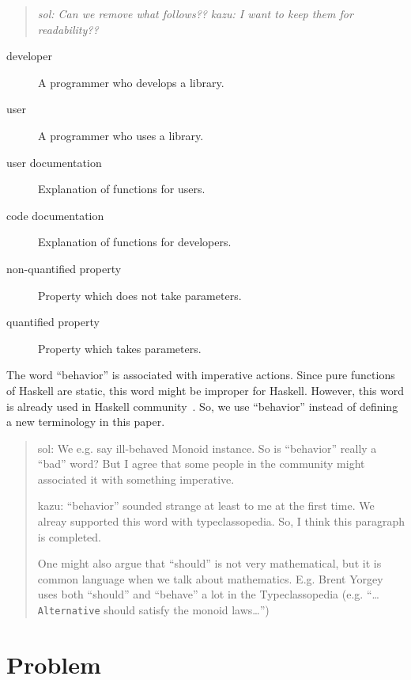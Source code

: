 \documentclass[preprint]{sigplanconf}
\begin{document}
\begin{quote}
    \emph{sol: Can we remove what follows??}
    \emph{kazu: I want to keep them for readability??}
\end{quote}

\begin{description}
\item[developer]
    A programmer who develops a library.

\item[user]
    A programmer who uses a library.


\item[user documentation]
    Explanation of functions for users.
\item[code documentation]
    Explanation of functions for developers.

\item[non-quantified property]
    Property which does not take parameters.

\item[quantified property]
    Property which takes parameters.

\end{description}

The word ``behavior'' is associated with imperative actions.
Since pure functions of Haskell are static,
this word might be improper for Haskell.
However, this word is already used in Haskell community~\cite{typeclassopedia}.
So, we use ``behavior'' instead of defining a new terminology in this paper.

\begin{quote}
    sol: We e.g. say ill-behaved Monoid instance.  So is
    ``behavior'' really a ``bad'' word?  But I agree that some people in
    the community might associated it with something imperative.

    kazu: ``behavior'' sounded strange at least to me at the first time.
    We alreay supported this word with typeclassopedia. So, I think
    this paragraph is completed.

    One might also argue that ``should'' is not very mathematical, but
    it is common language when we talk about mathematics.  E.g. Brent
    Yorgey uses both ``should'' and ``behave'' a lot in the
    Typeclassopedia (e.g. ``\ldots {\tt Alternative} should satisfy
    the monoid laws\ldots'')
\end{quote}

\section{Problem}
\end{document}
